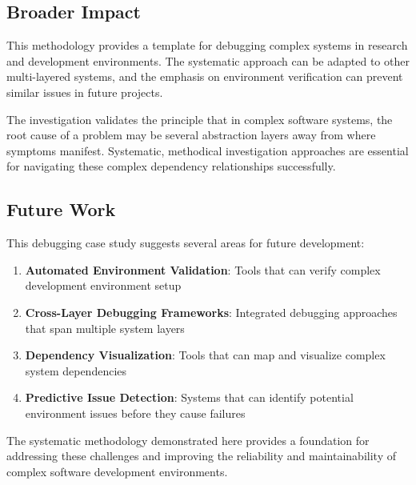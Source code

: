 \documentclass[11pt,a4paper]{article}
\begin{document}
\subsection{Broader Impact}

This methodology provides a template for debugging complex systems in research and development environments. The systematic approach can be adapted to other multi-layered systems, and the emphasis on environment verification can prevent similar issues in future projects.

The investigation validates the principle that in complex software systems, the root cause of a problem may be several abstraction layers away from where symptoms manifest. Systematic, methodical investigation approaches are essential for navigating these complex dependency relationships successfully.

\subsection{Future Work}

This debugging case study suggests several areas for future development:

\begin{enumerate}
\item \textbf{Automated Environment Validation}: Tools that can verify complex development environment setup
\item \textbf{Cross-Layer Debugging Frameworks}: Integrated debugging approaches that span multiple system layers
\item \textbf{Dependency Visualization}: Tools that can map and visualize complex system dependencies
\item \textbf{Predictive Issue Detection}: Systems that can identify potential environment issues before they cause failures
\end{enumerate}

The systematic methodology demonstrated here provides a foundation for addressing these challenges and improving the reliability and maintainability of complex software development environments.
\end{document}
